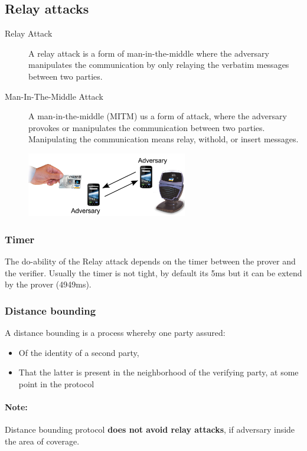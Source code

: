 
\subsection{Relay attacks}
\begin{description}
    \item[Relay Attack] A relay attack is a form of man-in-the-middle where the
    adversary manipulates the communication by only relaying the verbatim
    messages between two parties.
    \item[Man-In-The-Middle Attack] A man-in-the-middle (MITM) us a form of
    attack, where the adversary provokes or manipulates the communication
    between two parties. Manipulating the communication means relay, withold, or
    insert messages.
\end{description}

\begin{figure}[ht!]
    \centering
    \includegraphics[width=7cm]{img/relay-attack}
\end{figure}

\subsubsection{Timer}
The do-ability of the Relay attack depends on the timer
between the prover and the verifier. Usually the timer is not tight, by default
its 5ms but it can be extend by the prover (4949ms).

\subsubsection{Distance bounding}
A distance bounding is a process whereby one party
assured:
\begin{itemize}
    \item Of the identity of a second party,
    \item That the latter is present in the neighborhood of the verifying
        party, at some point in the protocol
\end{itemize}

\paragraph{Note:} Distance bounding protocol \textbf{does not avoid
relay attacks}, if adversary inside the area of coverage.

